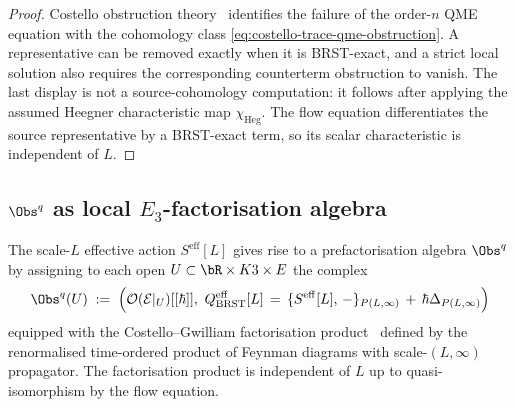 \begin{proof}
Costello obstruction theory~\cite[Theorem 5.0.1]{Cos11} identifies the
failure of the order-\(n\) QME equation with the cohomology class
\eqref{eq:costello-trace-qme-obstruction}. A representative can be
removed exactly when it is BRST-exact, and a strict local solution also
requires the corresponding counterterm obstruction to vanish. The last
display is not a source-cohomology computation: it follows after
applying the assumed Heegner characteristic map
\(\chi_{\mathrm{Heg}}\). The flow equation differentiates the source
representative by a BRST-exact term, so its scalar characteristic is
independent of \(L\).
\end{proof}

\subsection{$\Obs^q$ as local $E_3$-factorisation algebra}
\label{subsec:costello-trace-Obsq}

The scale-$L$ effective action $S^{\mathrm{eff}}[L]$ gives rise to a
prefactorisation algebra $\Obs^q$ by assigning to each open
$U\subset\bR\times K3\times E$ the complex
\begin{equation}\label{eq:costello-trace-Obsq}
 \Obs^q(U)
 \;:=\;
 \Bigl(\mathcal{O}(\mathcal{E}|_U)[[\hbar]],\
 Q_{\mathrm{BRST}}^{\mathrm{eff}}[L]
 \,=\,\{S^{\mathrm{eff}}[L],\,-\}_{P(L,\infty)}
 \,+\,\hbar\Delta_{P(L,\infty)}\Bigr)
\end{equation}
equipped with the Costello--Gwilliam
factorisation product~\cite[\S 9.4, Vol.~1]{CostelloGwilliam2017}
defined by the renormalised time-ordered product of Feynman diagrams
with scale-$(L,\infty)$ propagator. The factorisation product is
independent of $L$ up to quasi-isomorphism by the flow equation.

